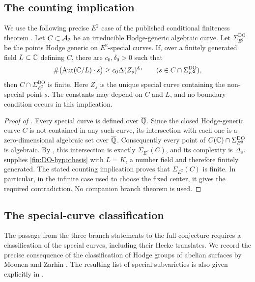 \subsection{The counting implication}

We use the following precise $E^2$ case of the published conditional
finiteness theorem \cite[Theorem~1.3, Conjecture~6.2, and
\S\S6.5--6.6]{DawOrr2022}.  Let $C\subset\mathcal A_2$ be an irreducible
Hodge-generic algebraic curve.  Let $\Sigma^{\mathrm{DO}}_{E^2}$
be the points Hodge generic on $E^2$-special curves.
If, over a finitely generated field $L\subset\mathbb C$ defining $C$,
there are $c_0,\delta_0>0$ such that
\begin{equation}\label{fin:DO-hypothesis}
 \#\bigl(\operatorname{Aut}(\mathbb C/L)\cdot s\bigr)
   \geq c_0\Delta(Z_s)^{\delta_0}
 \qquad(s\in C\cap\Sigma^{\mathrm{DO}}_{E^2}),
\end{equation}
then $C\cap\Sigma^{\mathrm{DO}}_{E^2}$ is finite.  Here $Z_s$ is
the unique special curve containing the non-special point $s$.
The constants may depend on $C$ and $L$, and no boundary condition
occurs in this implication.

\begin{proof}[Proof of ]
Every special curve is defined over $\overline{\mathbb Q}$.  Since the closed
Hodge-generic curve $C$ is not contained in any such curve, its
intersection with each one is a zero-dimensional algebraic set
over $\overline{\mathbb Q}$.  Consequently every point of
$C(\mathbb C)\cap\Sigma^{\mathrm{DO}}_{E^2}$ is algebraic.
By , this intersection is exactly
$\Sigma_{E^2}(C)$, and its complexity is $\Delta_s$.
 supplies \eqref{fin:DO-hypothesis} with $L=K$,
a number field and therefore finitely generated.  The stated
counting implication proves that $\Sigma_{E^2}(C)$ is finite.
In particular, in the infinite case used to choose the fixed center,
it gives the required contradiction. No companion branch theorem is used.
\end{proof}

\subsection{The special-curve classification}

The passage from the three branch statements to the full conjecture
requires a classification of the special curves, including their Hecke
translates. We record the precise consequence of the classification of
Hodge groups of abelian surfaces by Moonen and Zarhin
\cite[Theorem~(0.1)(iv), \S2 and Corollary~(3.9)]{MoonenZarhin1999}.
The resulting list of special subvarieties is also given explicitly
in \cite[\S2.F, Table~1]{DawOrrECM2021}.

